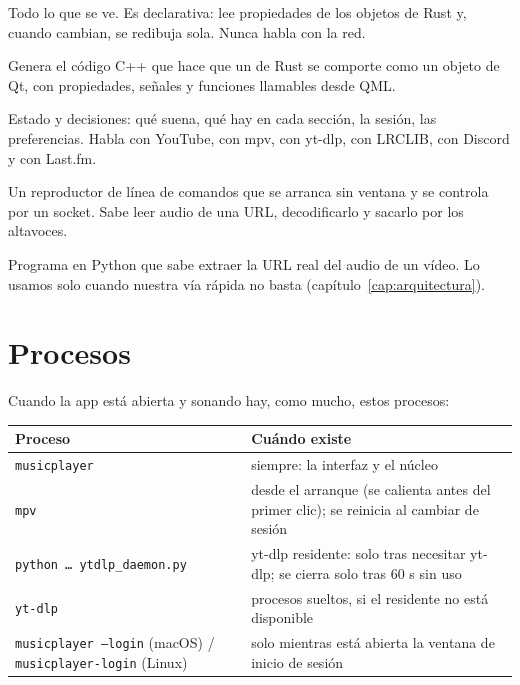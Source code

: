 \begin{description}[style=nextline, leftmargin=0pt]
  \item[Interfaz (QML)] Todo lo que se ve. Es declarativa: lee propiedades de los objetos de
  Rust y, cuando cambian, se redibuja sola. Nunca habla con la red.
  \item[Puente (cxx-qt)] Genera el código C++ que hace que un  de Rust se comporte
  como un objeto de Qt, con propiedades, señales y funciones llamables desde QML.
  \item[Núcleo (Rust)] Estado y decisiones: qué suena, qué hay en cada sección, la sesión, las
  preferencias. Habla con YouTube, con mpv, con yt-dlp, con LRCLIB, con Discord y con Last.fm.
  \item[mpv (proceso aparte)] Un reproductor de línea de comandos que se arranca sin ventana y
  se controla por un socket. Sabe leer audio de una URL, decodificarlo y sacarlo por los
  altavoces.
  \item[yt-dlp (proceso aparte)] Programa en Python que sabe extraer la URL real del audio de
  un vídeo. Lo usamos solo cuando nuestra vía rápida no basta (capítulo~\ref{cap:arquitectura}).
\end{description}

\section{Procesos}

Cuando la app está abierta y sonando hay, como mucho, estos procesos:

\begin{center}
\begin{tabularx}{\linewidth}{@{}lX@{}}
\toprule
Proceso & Cuándo existe \\
\midrule
\texttt{musicplayer} & siempre: la interfaz y el núcleo \\
\texttt{mpv} & desde el arranque (se calienta antes del primer clic); se reinicia al cambiar de sesión \\
\texttt{python … ytdlp\_daemon.py} & yt-dlp residente: solo tras necesitar yt-dlp; se cierra solo tras 60 s sin uso \\
\texttt{yt-dlp} & procesos sueltos, si el residente no está disponible \\
\texttt{musicplayer --login} (macOS) / \texttt{musicplayer-login} (Linux) & solo mientras está abierta la ventana de inicio de sesión \\
\bottomrule
\end{tabularx}
\end{center}


